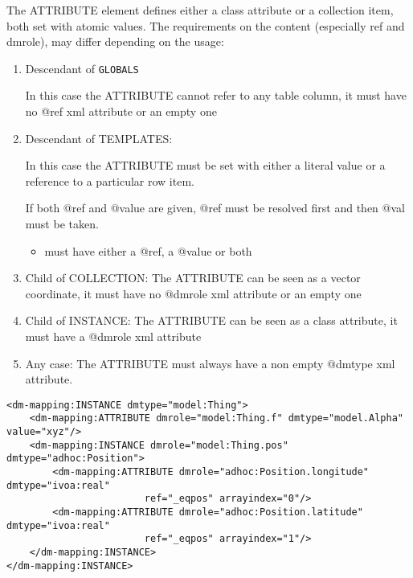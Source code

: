 
The ATTRIBUTE element defines either a class attribute or a collection item, both set with atomic values.
The requirements on
the content (especially ref and dmrole), may differ depending on
the usage:


\begin{enumerate}
\item Descendant of \texttt{GLOBALS}

  In this case the ATTRIBUTE cannot refer to any table column, it must have no @ref xml attribute or an empty one 
  
\item Descendant of TEMPLATES:

  In this case the ATTRIBUTE must be set with either a literal value or a reference to a particular row item. %
  
   If both @ref and @value are given, @ref must be resolved first and then @val must be taken. 

  \begin{itemize}
     \item must have either a @ref, a @value or both 
  \end{itemize}  

\item Child of COLLECTION:
    The ATTRIBUTE can be seen as a vector coordinate, 
    it must have  no @dmrole xml attribute or an empty one
    
\item Child of INSTANCE: 
    The ATTRIBUTE can be seen as a class attribute, 
    it must have a @dmrole xml attribute
           
\item Any case:     
    The ATTRIBUTE must always have a non empty @dmtype xml attribute.
\end{enumerate}  
    
    
\begin{lstlisting}[frame=single,caption={ATTRIBUTE examples},style=XML,basicstyle=\tiny]
<dm-mapping:INSTANCE dmtype="model:Thing">
    <dm-mapping:ATTRIBUTE dmrole="model:Thing.f" dmtype="model.Alpha" value="xyz"/>		
    <dm-mapping:INSTANCE dmrole="model:Thing.pos" dmtype="adhoc:Position">
        <dm-mapping:ATTRIBUTE dmrole="adhoc:Position.longitude" dmtype="ivoa:real" 
                        ref="_eqpos" arrayindex="0"/>
        <dm-mapping:ATTRIBUTE dmrole="adhoc:Position.latitude" dmtype="ivoa:real" 
                        ref="_eqpos" arrayindex="1"/>
    </dm-mapping:INSTANCE>
</dm-mapping:INSTANCE>
\end{lstlisting}  


